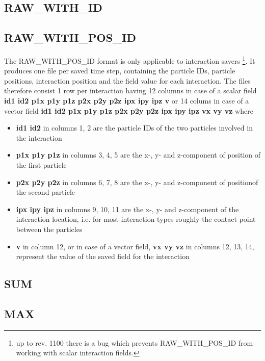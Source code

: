 \subsection{RAW\_WITH\_ID}


\subsection{RAW\_WITH\_POS\_ID}
The RAW\_WITH\_POS\_ID format is only applicable to interaction savers \footnote{up to rev. 1100 there is a bug which prevents RAW\_WITH\_POS\_ID from working with scalar interaction fields.}. It produces one file per saved time step, containing the particle IDs, particle positions, interaction position and the field value for each interaction. The files therefore consist 1 row per interaction having 12 columns in case of a scalar field \textbf{id1 id2 p1x p1y p1z p2x p2y p2z ipx ipy ipz v} or 14 colums in case of a vector field \textbf{id1 id2 p1x p1y p1z p2x p2y p2z ipx ipy ipz vx vy vz} where
\begin{itemize}
\item \textbf{id1 id2} in columns 1, 2 are the particle IDs of the two particles involved in the interaction
\item \textbf{p1x p1y p1z} in columns 3, 4, 5 are the x-, y- and z-component of position of the first particle
\item \textbf{p2x p2y p2z} in columns 6, 7, 8 are the x-, y- and z-component of positionof the second particle
\item \textbf{ipx ipy ipz} in columns 9, 10, 11 are the x-, y- and z-component of the interaction location, i.e. for most interaction types roughly the contact point between the particles
\item \textbf{v} in column 12, or in case of a vector field, \textbf{vx vy vz} in columns 12, 13, 14, represent the value of the saved field for the interaction 
\end{itemize}

\subsection{SUM}
\subsection{MAX}